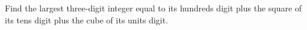 Find the largest three-digit integer equal to its hundreds digit plus the square of its tens digit plus the cube of its units digit.
